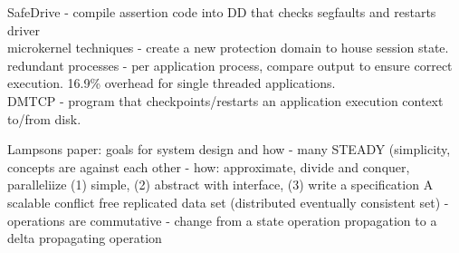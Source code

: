 \documentclass{article}
\begin{document}
\noindent\cite{zhou:osdi2006-safedrive} SafeDrive - compile assertion code into DD that checks segfaults and restarts driver\\

\noindent\cite{david:osdi2008-curios} microkernel techniques - create a new protection domain to house session state.\\

\noindent\cite{shye:DSN2007-plr} redundant processes - per application process, compare output to ensure correct execution. 16.9\% overhead for single threaded applications.\\

\noindent\cite{ansel:ipdps2009-dmtcp} DMTCP - program that checkpoints/restarts an application execution context to/from disk. 

Lampsons paper: goals for system design and how
	- many STEADY (simplicity, concepts are against each other
	- how: approximate, divide and conquer, paralleliize
	(1) simple, (2) abstract with interface, (3) write a specification
A scalable conflict free replicated data set (distributed eventually consistent set)
	- operations are commutative
	- change from a state operation propagation to a delta propagating operation


  


\newpage
\onecolumn
\appendix
\end{document}
